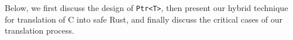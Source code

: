 \documentclass{llncs} %
\begin{document}
Below, we first discuss the design of \texttt{Ptr<T>}, then present our hybrid technique for translation of C into safe Rust, and finally discuss the critical cases of our translation process.


\end{document}
